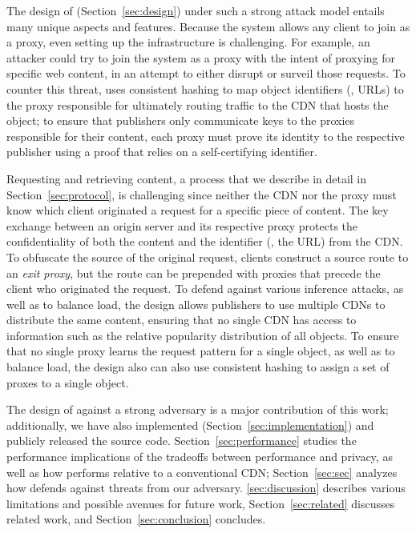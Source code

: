 The design of \system{} (Section~\ref{sec:design}) under such a strong attack
model entails many unique aspects and features. Because the system allows any
client to join as a proxy, even setting up the infrastructure is challenging.
For example, an attacker could try to join the system as a proxy with the
intent of proxying for specific web content, in an attempt to either disrupt
or surveil those requests. To counter this threat, \system{} uses consistent
hashing to map object identifiers (\ie, URLs) to the proxy responsible for
ultimately routing traffic to the CDN that hosts the object; to ensure that
publishers only communicate keys to the proxies responsible for their content,
each proxy must prove its identity to the respective publisher using a proof
that relies on a self-certifying identifier. 

Requesting and retrieving content, a process that we describe in detail in
Section~\ref{sec:protocol}, is challenging since neither the CDN nor the proxy
must know which client originated a request for a specific piece of content.
The key exchange between an origin server and its respective proxy protects
the confidentiality of both the content and the identifier (\ie, the URL) from
the CDN. To obfuscate the source of the original request, clients construct a
source route to an {\em exit proxy}, but the route can be prepended with
proxies that precede the client who originated the request. To defend against
various inference attacks, as well as to balance load, the \system{} design
allows publishers to use multiple CDNs to distribute the same content,
ensuring that no single CDN has access to information such as the relative
popularity distribution of all objects. To ensure that no single proxy learns
the request pattern for a single object, as well as to balance load, the
design also can also use consistent hashing to assign a set of proxes to a
single object. 

The design of \system{} against a strong adversary is a major
contribution of this work; additionally, we have also implemented \system{}
(Section~\ref{sec:implementation}) and publicly released the source code.
Section~\ref{sec:performance} studies the performance implications of the
tradeoffs between performance and privacy, as well as how \system{} performs
relative to a conventional CDN; Section~\ref{sec:sec} analyzes how \system{}
defends against threats from our adversary.
\ref{sec:discussion} describes various
limitations and possible avenues for future work, Section~\ref{sec:related}
discusses related work, and Section~\ref{sec:conclusion} concludes.


